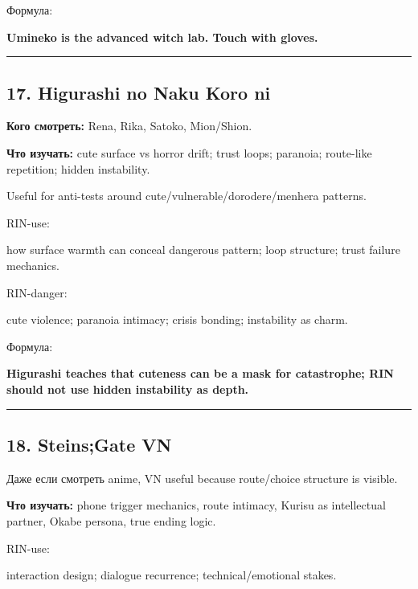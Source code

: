 Формула:

\textbf{Umineko is the advanced witch lab. Touch with gloves.}

\begin{center}\rule{0.5\linewidth}{0.5pt}\end{center}

\subsection*{17. Higurashi no Naku Koro ni}

\textbf{Кого смотреть:} Rena, Rika, Satoko, Mion/\hspace{0pt}Shion.

\textbf{Что изучать:} cute surface vs horror drift; trust loops;
paranoia; route-like repetition; hidden instability.

Useful for anti-tests around cute/\hspace{0pt}vulnerable/\hspace{0pt}dorodere/\hspace{0pt}menhera patterns.

RIN-use:

how surface warmth can conceal dangerous pattern; loop structure; trust
failure mechanics.

RIN-danger:

cute violence; paranoia intimacy; crisis bonding; instability as charm.

Формула:

\textbf{Higurashi teaches that cuteness can be a mask for catastrophe;
RIN should not use hidden instability as depth.}

\begin{center}\rule{0.5\linewidth}{0.5pt}\end{center}

\subsection*{18. Steins;Gate VN}

Даже если смотреть anime, VN useful because route/\hspace{0pt}choice structure is
visible.

\textbf{Что изучать:} phone trigger mechanics, route intimacy, Kurisu as
intellectual partner, Okabe persona, true ending logic.

RIN-use:

interaction design; dialogue recurrence; technical/\hspace{0pt}emotional stakes.


